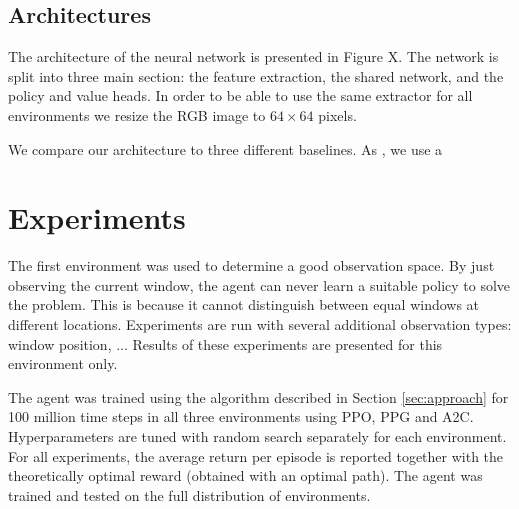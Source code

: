 
\subsection{Architectures}



The architecture of the neural network is presented in Figure X.
The network is split into three main section: the feature extraction, the shared network, and the policy and value heads.
In order to be able to use the same extractor for all environments we resize the RGB image to \(64 \times 64\) pixels.

We compare our architecture to three different baselines.
As \cite{mirowski_navigate_2017}, we use a 






\section{Experiments}
\label{sec:experiments}

The first environment was used to determine a good observation space.
By just observing the current window, the agent can never learn a suitable policy to solve the problem.
This is because it cannot distinguish between equal windows at different locations.
Experiments are run with several additional observation types: window position, ...
Results of these experiments are presented for this environment only.

The agent was trained using the algorithm described in Section \ref{sec:approach} for 100 million time steps in all three environments using PPO, PPG and A2C.
Hyperparameters are tuned with random search separately for each environment.
For all experiments, the average return per episode is reported together with the theoretically optimal reward (obtained with an optimal path).
The agent was trained and tested on the full distribution of environments.

